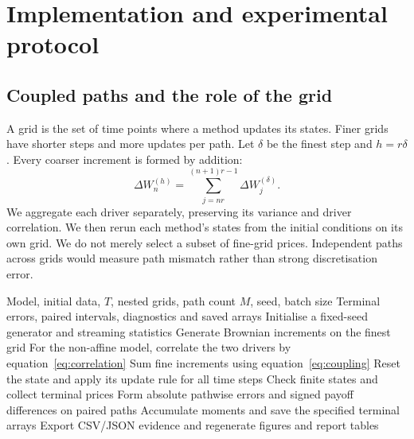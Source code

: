 \documentclass[11pt,a4paper]{article}
\begin{document}
\section{Implementation and experimental protocol}\label{sec:implementation}
\subsection{Coupled paths and the role of the grid}
A grid is the set of time points where a method updates its states. Finer grids have shorter steps and more updates per path. Let $\delta$ be the finest step and $h=r\delta$. Every coarser increment is formed by addition:
\begin{equation}\label{eq:coupling}
\Delta W_n^{(h)}=\sum_{j=nr}^{(n+1)r-1}\Delta W_j^{(\delta)}.
\end{equation}
We aggregate each driver separately, preserving its variance and driver correlation. We then rerun each method's states from the initial conditions on its own grid. We do not merely select a subset of fine-grid prices. Independent paths across grids would measure path mismatch rather than strong discretisation error.

\begin{algorithm}[H]
\caption{Coupled terminal comparison with bounded-memory batches}\label{alg:coupled}
\begin{algorithmic}[1]
\Require Model, initial data, $T$, nested grids, path count $M$, seed, batch size
\Ensure Terminal errors, paired intervals, diagnostics and saved arrays
\State Initialise a fixed-seed generator and streaming statistics
\State Generate Brownian increments on the finest grid
\State For the non-affine model, correlate the two drivers by equation~\eqref{eq:correlation}
\State Sum fine increments using equation~\eqref{eq:coupling}
\State Reset the state and apply its update rule for all time steps
\State Check finite states and collect terminal prices
\EndFor
\State Form absolute pathwise errors and signed payoff differences on paired paths
\State Accumulate moments and save the specified terminal arrays
\EndFor
\State Export CSV/JSON evidence and regenerate figures and report tables
\end{algorithmic}
\end{algorithm}
\end{document}
